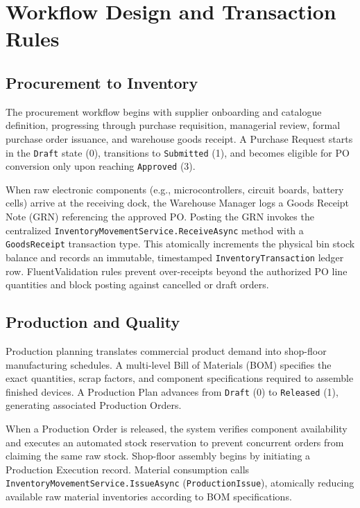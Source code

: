\documentclass[conference]{IEEEtran}
\begin{document}
\section{Workflow Design and Transaction Rules}

\subsection{Procurement to Inventory}
The procurement workflow begins with supplier onboarding and catalogue definition, progressing through purchase requisition, managerial review, formal purchase order issuance, and warehouse goods receipt. A Purchase Request starts in the \texttt{Draft} state (0), transitions to \texttt{Submitted} (1), and becomes eligible for PO conversion only upon reaching \texttt{Approved} (3). 

When raw electronic components (e.g., microcontrollers, circuit boards, battery cells) arrive at the receiving dock, the Warehouse Manager logs a Goods Receipt Note (GRN) referencing the approved PO. Posting the GRN invokes the centralized \texttt{InventoryMovementService.ReceiveAsync} method with a \texttt{GoodsReceipt} transaction type. This atomically increments the physical bin stock balance and records an immutable, timestamped \texttt{InventoryTransaction} ledger row. FluentValidation rules prevent over-receipts beyond the authorized PO line quantities and block posting against cancelled or draft orders.

\subsection{Production and Quality}
Production planning translates commercial product demand into shop-floor manufacturing schedules. A multi-level Bill of Materials (BOM) specifies the exact quantities, scrap factors, and component specifications required to assemble finished devices. A Production Plan advances from \texttt{Draft} (0) to \texttt{Released} (1), generating associated Production Orders.

When a Production Order is released, the system verifies component availability and executes an automated stock reservation to prevent concurrent orders from claiming the same raw stock. Shop-floor assembly begins by initiating a Production Execution record. Material consumption calls \texttt{InventoryMovementService.IssueAsync} (\texttt{ProductionIssue}), atomically reducing available raw material inventories according to BOM specifications. 
\end{document}
